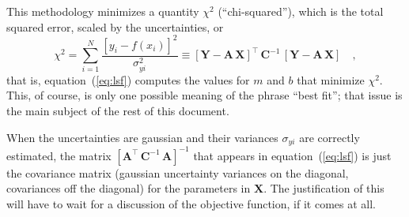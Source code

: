 \documentclass[12pt,twoside]{article}
\newcommand{\documentname}{document}
\newcommand{\equationname}{equation}
\newcommand{\mmatrix}[1]{\boldsymbol{#1}}
\newcommand{\inverse}[1]{{#1}^{-1}}
\newcommand{\transpose}[1]{{#1}^{\scriptscriptstyle \top}}
\newcommand{\mA}{\mmatrix{A}}
\newcommand{\mAT}{\transpose{\mA}}
\newcommand{\mC}{\mmatrix{C}}
\newcommand{\mCinv}{\inverse{\mC}}
\newcommand{\mX}{\mmatrix{X}}
\newcommand{\mY}{\mmatrix{Y}}
\begin{document}
This methodology minimizes a quantity $\chi^2$ (``chi-squared''),
which is the total squared error, scaled by the uncertainties, or
\begin{equation}\label{eq:chisquared}
\chi^2
 = \sum_{i=1}^N \frac{\left[y_i - f(x_i)\right]^2}{\sigma_{yi}^2}
 \equiv \transpose{\left[\mY-\mA\,\mX\right]}
 \,\mCinv\,\left[\mY-\mA\,\mX\right]
 \quad ,
\end{equation}
that is, \equationname~(\ref{eq:lsf}) computes the values for $m$ and
$b$ that minimize $\chi^2$.  This, of course, is only one possible
meaning of the phrase ``best fit''; that issue is the main subject of
the rest of this \documentname.

When the uncertainties are gaussian and their variances $\sigma_{yi}$
are correctly estimated, the matrix
$\inverse{\left[\mAT\,\mCinv\,\mA\right]}$ that appears in
\equationname~(\ref{eq:lsf}) is just the covariance matrix (gaussian
uncertainty variances on the diagonal, covariances off the diagonal)
for the parameters in $\mX$.  The justification of this will have to
wait for a discussion of the objective function, if it comes at all.
\end{document}

